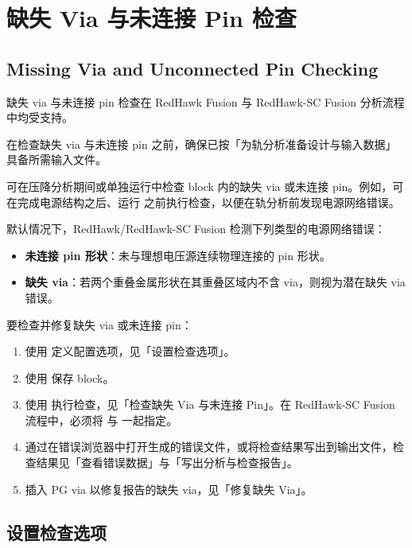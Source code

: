 \section{缺失 Via 与未连接 Pin 检查}
\subsection*{Missing Via and Unconnected Pin Checking}

\begin{noteBox}
缺失 via 与未连接 pin 检查在 RedHawk Fusion 与 RedHawk-SC Fusion 分析流程中均受支持。
\end{noteBox}

在检查缺失 via 与未连接 pin 之前，确保已按「为轨分析准备设计与输入数据」具备所需输入文件。

可在压降分析期间或单独运行中检查 block 内的缺失 via 或未连接 pin。例如，可在完成电源结构之后、运行  之前执行检查，以便在轨分析前发现电源网络错误。

默认情况下，RedHawk/RedHawk-SC Fusion 检测下列类型的电源网络错误：
\begin{itemize}
  \item \textbf{未连接 pin 形状}：未与理想电压源连续物理连接的 pin 形状。
  \item \textbf{缺失 via}：若两个重叠金属形状在其重叠区域内不含 via，则视为潜在缺失 via 错误。
\end{itemize}

要检查并修复缺失 via 或未连接 pin：
\begin{enumerate}
  \item 使用  定义配置选项，见「设置检查选项」。
  \item 使用  保存 block。
  \item 使用   执行检查，见「检查缺失 Via 与未连接 Pin」。在 RedHawk-SC Fusion 流程中，必须将  与  一起指定。
  \item 通过在错误浏览器中打开生成的错误文件，或将检查结果写出到输出文件，检查结果见「查看错误数据」与「写出分析与检查报告」。
  \item 插入 PG via 以修复报告的缺失 via，见「修复缺失 Via」。
\end{enumerate}

\subsection{设置检查选项}
